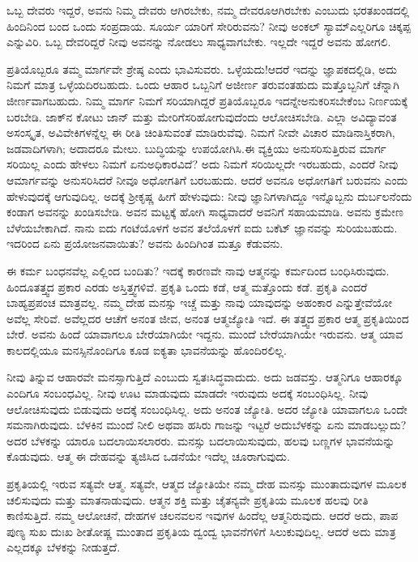 ಒಬ್ಬ ದೇವರು ಇದ್ದರೆ, ಅವನು ನಿಮ್ಮ ದೇವರು ಆಗಿರಬೇಕು, ನಮ್ಮ ದೇವರೂ\break ಆಗಿರಬೇಕು ಎಂಬುದು ಭರತಖಂಡದಲ್ಲಿ ಹಿಂದಿನಿಂದ ಬಂದ ಒಂದು ಸಂಪ್ರದಾಯ. ಸೂರ್ಯ ಯಾರಿಗೆ ಸೇರಿರುವನು? ನೀವು ಅಂಕಲ್​ ಸ್ಯಾಮ್​ ಎಲ್ಲರಿಗೂ ಚಿಕ್ಕಪ್ಪ ಎನ್ನುವಿರಿ. ಒಬ್ಬ ದೇವರಿದ್ದರೆ ನೀವು ಅವನನ್ನು ನೋಡಲು ಸಾಧ್ಯವಾಗಬೇಕು. ಇಲ್ಲದೇ ಇದ್ದರೆ ಅವನು ಹೋಗಲಿ.

ಪ್ರತಿಯೊಬ್ಬರೂ ತಮ್ಮ ಮಾರ್ಗವೇ ಶ್ರೇಷ್ಠ ಎಂದು ಭಾವಿಸುವರು. ಒಳ್ಳೆಯದು!\break ಆದರೆ ಇದನ್ನು ಜ್ಞಾಪಕದಲ್ಲಿಡಿ, ಅದು ನಿಮಗೆ ಮಾತ್ರ ಒಳ್ಳೆಯದಿರಬಹುದು. ಒಂದು ಆಹಾರ ಒಬ್ಬನಿಗೆ ಅಜೀರ್ಣ ತರುವಂತಹುದು ಮತ್ತೊಬ್ಬನಿಗೆ ಚೆನ್ನಾಗಿ ಜೀರ್ಣವಾಗಬಹುದು. ನಿಮ್ಮ ಮಾರ್ಗ ನಿಮಗೆ ಸರಿಯಾಗಿದ್ದರೆ ಪ್ರತಿಯೊಬ್ಬರೂ ಇದನ್ನೇ\break ಅನುಕರಿಸಬೇಕೆಂಬ ನಿರ್ಣಯಕ್ಕೆ ಬರಬೇಡಿ. ಜಾಕ್​ನ ಕೋಟು ಜಾನ್​ ಮತ್ತು ಮೇರಿಗೆ\break ಸರಿಹೋಗುವುದೆಂದು ಆಲೋಚಿಸಬೇಡಿ. ಎಲ್ಲಾ ಅವಿದ್ಯಾವಂತ ಅಸಂಸ್ಕೃತ, ಅವಿವೇಕಿಗಳನ್ನೆಲ್ಲ ಈ ರೀತಿ ಚಿಂತಿಸುವಂತೆ ಮಾಡಿರುವೆವು. ನಿಮಗೆ ನೀವೇ ವಿಚಾರ ಮಾಡಿ\break ನಾಸ್ತಿಕರಾಗಿ, ಜಡವಾದಿಗಳಾಗಿ; ಅದಾದರೂ ಮೇಲು. ಬುದ್ಧಿಯನ್ನು ಉಪಯೋಗಿಸಿ.\break ಈ ವ್ಯಕ್ತಿಯು ಅನುಸರಿಸುತ್ತಿರುವ ಮಾರ್ಗ ಸರಿಯಿಲ್ಲ ಎಂದು ಹೇಳಲು ನಿಮಗೆ ಏನು\break ಅಧಿಕಾರವಿದೆ? ಅದು ನಿಮಗೆ ಸರಿಯಿಲ್ಲದೇ ಇರಬಹುದು, ಎಂದರೆ ನೀವು ಆ\break ಮಾರ್ಗವನ್ನು ಅನುಸರಿಸಿದರೆ ನೀವೂ ಅಧೋಗತಿಗೆ ಬರಬಹುದು. ಆದರೆ ಅವನೂ ಅಧೋಗತಿಗೆ ಬರುವನು ಎಂದು ಹೇಳುವುದಕ್ಕೆ ಆಗುವುದಿಲ್ಲ. ಅದಕ್ಕೆ ಶ‍್ರೀಕೃಷ್ಣ ಹೀಗೆ ಹೇಳುವುದು: ನೀವು ಜ್ಞಾನಿಗಳಾಗಿದ್ದೂ ಇನ್ನೊಬ್ಬನು ದುರ್ಬಲನೆಂದು ಕಂಡಾಗ ಅವನನ್ನು ಖಂಡಿಸಬೇಡಿ. ಅವನ ಮಟ್ಟಕ್ಕೆ ಹೋಗಿ ಸಾಧ್ಯವಾದರೆ ಅವನಿಗೆ ಸಹಾಯಮಾಡಿ. ಅವನು ಕ್ರಮೇಣ ಬೆಳೆಯಬೇಕಾಗಿದೆ. ನಾನು ಐದು ಗಂಟೆಯೊಳಗೆ ಅವನ ತಲೆಯೊಳಗೆ ಐದು ಬಕೆಟ್​ ಜ್ಞಾನವನ್ನು ಸುರಿಯಬಹುದು. ಇದರಿಂದ ಏನು ಪ್ರಯೋಜನವಾಯಿತು? ಅವನು ಹಿಂದಿಗಿಂತ ಮತ್ತೂ ಕೆಡುವನು.

ಈ ಕರ್ಮ ಬಂಧನವೆಲ್ಲ ಎಲ್ಲಿಂದ ಬಂದಿತು? ಇದಕ್ಕೆ ಕಾರಣವೇ ನಾವು ಆತ್ಮನನ್ನು ಕರ್ಮದಿಂದ ಬಂಧಿಸಿರುವುದು. ಹಿಂದೂತತ್ತ್ವದ ಪ್ರಕಾರ ಎರಡು ಅಸ್ತಿತ್ತ್ವಗಳಿವೆ. ಪ್ರಕೃತಿ ಒಂದು ಕಡೆ, ಆತ್ಮ ಮತ್ತೊಂದು ಕಡೆ. ಪ್ರಕೃತಿ ಎಂದರೆ ಬಾಹ್ಯಪ್ರಪಂಚ ಮಾತ್ರವಲ್ಲ. ನಮ್ಮ ದೇಹ ಮನಸ್ಸು ಇಚ್ಚೆ ಮತ್ತು ನಾವು ಯಾವುದನ್ನು ಅಹಂಕಾರ ಎನ್ನುತ್ತೇವೆಯೋ ಅವೆಲ್ಲ ಸೇರಿವೆ. ಅವೆಲ್ಲದರ ಆಚೆಗೆ ಅನಂತ ಜೀವ, ಅನಂತ ಆತ್ಮಜ್ಯೋತಿ ಇದೆ. ಈ ತತ್ತ್ವದ ಪ್ರಕಾರ ಆತ್ಮ ಪ್ರಕೃತಿಯಿಂದ ಬೇರೆ. ಅವನು ಹಿಂದೆ ಯಾವಾಗಲೂ ಬೇರೆಯಾಗಿಯೇ ಇದ್ದನು. ಮುಂದೆ ಬೇರೆಯಾಗಿಯೇ ಇರುವನು. ಆತ್ಮ ಯಾವ ಕಾಲದಲ್ಲಿಯೂ ಮನಸ್ಸಿನೊಂದಿಗೂ ಕೂಡ ಐಕ್ಯತಾ ಭಾವನೆಯನ್ನು ಹೊಂದಿರಲಿಲ್ಲ.

ನೀವು ತಿನ್ನುವ ಆಹಾರವೇ ಮನಸ್ಸಾಗುತ್ತಿದೆ ಎಂಬುದು ಸ್ವತಃಸಿದ್ಧವಾದುದು. ಅದು ಜಡವಸ್ತು. ಆತ್ಮನಿಗೂ ಆಹಾರಕ್ಕೂ ಎಂದಿಗೂ ಸಂಬಂಧವಿಲ್ಲ. ನೀವು ಊಟ ಮಾಡುವುದು ಮಾಡದೇ ಇರುವುದು ಅದಕ್ಕೆ ಸಂಬಂಧಿಸಿಲ್ಲ. ನೀವು ಆಲೋಚಿಸುವುದು ಬಿಡುವುದು ಅದಕ್ಕೆ ಸಂಬಂಧಿಸಿಲ್ಲ. ಅದು ಅನಂತ ಜ್ಯೋತಿ. ಅದರ ಜ್ಯೋತಿ ಯಾವಾಗಲೂ ಒಂದೇ ಸಮನಾಗಿರುವುದು. ಬೆಳಕಿನ ಮುಂದೆ ನೀಲಿ ಅಥವಾ ಹಸಿರು ಗಾಜನ್ನು ಇಟ್ಟರೆ ಅದು\break ಬೆಳಕನ್ನು ಏನು ಮಾಡಬಲ್ಲುದು? ಅದರ ಬೆಳಕನ್ನು ಯಾರೂ ಬದಲಾಯಿಸಲಾರರು. ಮನಸ್ಸು ಬದಲಾಯಿಸುವುದು, ಹಲವು ಬಣ್ಣಗಳ ಭಾವನೆಯನ್ನು ಕೊಡುವುದು. ಆತ್ಮ ಈ ದೇಹವನ್ನು ತ್ಯಜಿಸಿದ ಒಡನೆಯೇ ಇದೆಲ್ಲ ಚೂರಾಗುವುದು.

ಪ್ರಕೃತಿಯಲ್ಲಿ ಇರುವ ಸತ್ಯವೇ ಆತ್ಮ. ಸತ್ಯವೇ, ಆತ್ಮದ ಜ್ಯೋತಿಯೇ ನಮ್ಮ ದೇಹ ಮನಸ್ಸು ಮುಂತಾದುವುಗಳ ಮೂಲಕ ಚಲಿಸುವುದು ಮತ್ತು ಮಾತನಾಡುವುದು. ಆತ್ಮನ ಶಕ್ತಿ ಮತ್ತು ಚೈತನ್ಯವೇ ಪ್ರಕೃತಿಯ ಮೂಲಕ ಹಲವು ರೀತಿ ಕಾಣಿಸುತ್ತಿದೆ. ನಮ್ಮ ಆಲೋಚನೆ, ದೇಹಗಳ ಚಲನವಲನ ಇವುಗಳ ಹಿಂದೆಲ್ಲ ಆತ್ಮನಿರುವುದು. ಆದರೆ ಅದು, ಪಾಪ ಪುಣ್ಯ ಸುಖ ದುಃಖ ಶೀತೋಷ್ಣ ಮುಂತಾದ ಪ್ರಕೃತಿಯ ದ್ವಂದ್ವ ಭಾವನೆಗಳಿಗೆ ಸಿಲುಕುವುದಿಲ್ಲ. ಆದರೆ ಅದು ಮಾತ್ರ ಎಲ್ಲದಕ್ಕೂ ಬೆಳಕನ್ನು ನೀಡುತ್ತದೆ.

